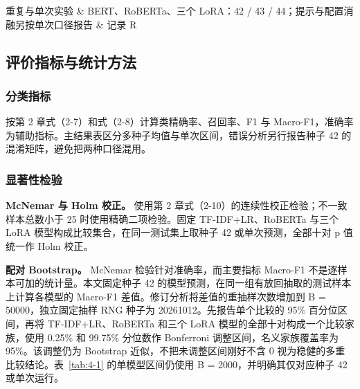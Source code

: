 \begin{table}[htbp]
\begin{minipage}{\textwidth}
\begin{tabular}
重复与单次实验 & BERT、RoBERTa、三个 LoRA：42 /\allowbreak{} 43 /\allowbreak{} 44；提示与配置消融另按单次口径报告 & 记录 R \\
\bottomrule\end{tabular}
\par{}
\end{minipage}
\end{table}

\FloatBarrier\subsection{评价指标与统计方法}

\subsubsection{分类指标}

按第 2 章式（2-7）和式（2-8）计算类精确率、召回率、F1 与 Macro-F1，准确率为辅助指标。主结果表区分多种子均值与单次区间，错误分析另行报告种子 42 的混淆矩阵，避免把两种口径混用。

\subsubsection{显著性检验}

\textbf{McNemar 与 Holm 校正。} 使用第 2 章式（2-10）的连续性校正检验；不一致样本总数小于 25 时使用精确二项检验。固定 TF-IDF+LR、RoBERTa 与三个 LoRA 模型构成比较集合，在同一测试集上取种子 42 或单次预测，全部十对 p 值统一作 Holm 校正\cite{ref27,ref29}。

\textbf{配对 Bootstrap。} McNemar 检验针对准确率，而主要指标 Macro-F1 不是逐样本可加的统计量。本文固定种子 42 的模型预测，在同一组有放回抽取的测试样本上计算各模型的 Macro-F1 差值\cite{ref28}。修订分析将差值的重抽样次数增加到 B = 50000，独立固定抽样 RNG 种子为 20261012。先报告单个比较的 95\% 百分位区间，再将 TF-IDF+LR、RoBERTa 和三个 LoRA 模型的全部十对构成一个比较家族，使用 0.25\% 和 99.75\% 分位数作 Bonferroni 调整区间，名义家族覆盖率为 95\%。该调整仍为 Bootstrap 近似，不把未调整区间刚好不含 0 视为稳健的多重比较结论。表~\ref{tab:4-1} 的单模型区间仍使用 B = 2000，并明确其仅对应种子 42 或单次运行。

